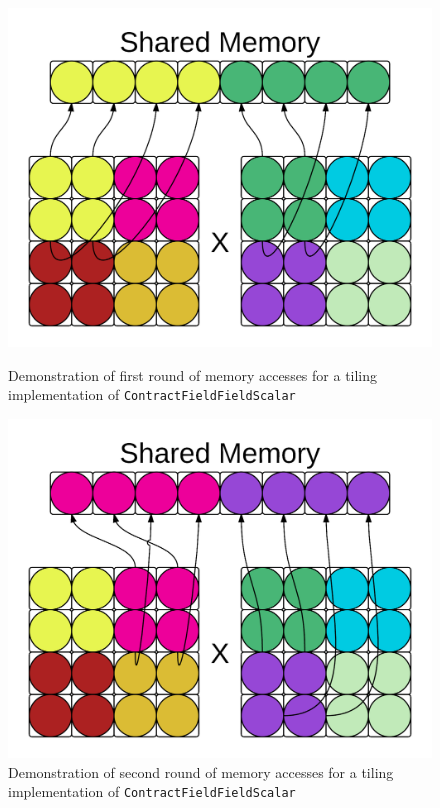\begin{figure}[!ht]
    \centering
    \includegraphics[scale = .4]{SharedMem1.png}
    \caption[Memory accesses -- tiling]{Demonstration of first round of memory
        accesses for a tiling implementation of \texttt{ContractFieldFieldScalar}}
    
    \includegraphics[scale = .4]{SharedMem2.png} \caption[Memory accesses --
    tiling]{Demonstration of second round of memory accesses for a tiling
        implementation of \texttt{ContractFieldFieldScalar}}
\label{fig:Tiling}
\end{figure}

